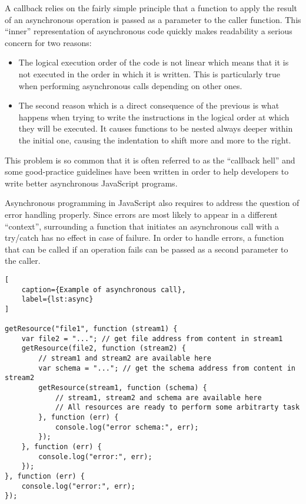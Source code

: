 A callback relies on the fairly simple principle that a function to apply the result of an asynchronous operation is passed as a parameter to the caller function. This ``inner'' representation of asynchronous code quickly makes readability a serious concern for two reasons:
\begin{itemize}
    \item The logical execution order of the code is not linear which means that it is not executed in the order in which it is written. This is particularly true when performing asynchronous calls depending on other ones.
    \item The second reason which is a direct consequence of the previous is what happens when trying to write the instructions in the logical order at which they will be executed. It causes functions to be nested always deeper within the initial one, causing the indentation to shift more and more to the right.
\end{itemize}

This problem is so common that it is often referred to as the ``callback hell'' and some good-practice guidelines have been written in order to help developers to write better asynchronous JavaScript programs\cite{CallbackHell}.

Asynchronous programming in JavaScript also requires to address the question of error handling properly. Since errors are most likely to appear in a different ``context'', surrounding a function that initiates an asynchronous call with a try/catch has no effect in case of failure. In order to handle errors, a function that can be called if an operation fails can be passed as a second parameter to the caller.

\begin{lstlisting}[
    caption={Example of asynchronous call},
    label={lst:async}
]

getResource("file1", function (stream1) {
    var file2 = "..."; // get file address from content in stream1
    getResource(file2, function (stream2) {
        // stream1 and stream2 are available here
        var schema = "..."; // get the schema address from content in stream2
        getResource(stream1, function (schema) {
            // stream1, stream2 and schema are available here
            // All resources are ready to perform some arbitrarty task
        }, function (err) {
            console.log("error schema:", err);
        });
    }, function (err) {
        console.log("error:", err);
    });
}, function (err) {
    console.log("error:", err);
});
\end{lstlisting}

